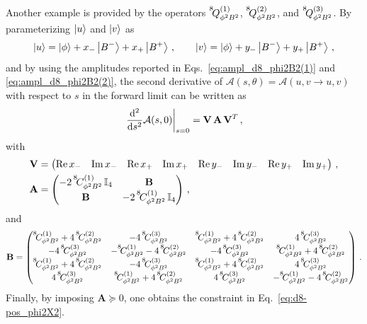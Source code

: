 Another example is provided by the operators $\op{8}{\phi^2 B^2}{(1)}$, $\op{8}{\phi^2 B^2}{(2)}$, and $\op{8}{\phi^2 B^2}{(3)}$.
By parameterizing $\ket{u}$ and $\ket{v}$ as
\begin{equation}
    \ket{u} = \ket{\phi}+x_-\ket{B^-}+x_+\ket{B^+}\,,
    \qquad 
    \ket{v} = \ket{\phi}+y_-\ket{B^-}+y_+\ket{B^+}\,,
\end{equation}
and by using the amplitudes reported in Eqs.~\eqref{eq:ampl_d8_phi2B2(1)} and \eqref{eq:ampl_d8_phi2B2(2)},
the second derivative of $\mathcal A(s,\theta) = \mathcal A(u,v \to u,v)$ with respect to $s$ in the forward limit can be written as
\begin{equation}
    \left.\dv[2]{}{s}\mathcal A(s,0)\right|_{s=0} = \mathbf V\,\mathbf A\,\mathbf V^{T}\,,
\end{equation}
with
\begin{align}
    \mathbf V &=
    \begin{pmatrix}
        \Re x_- & \Im x_- & \Re x_+ & \Im x_+ & \Re y_- & \Im y_- & \Re y_+ & \Im y_+
    \end{pmatrix}\,,
    \\
    \mathbf A &=
    \begin{pmatrix}
-2\,\coef{8}{\phi^2 B^2}{(1)}\,\mathbb{I}_{4} & \mathbf B \\
\mathbf B & -2\,\coef{8}{\phi^2 B^2}{(1)}\,\mathbb{I}_{4}
\end{pmatrix}\,,
\end{align}
and
\begin{equation}
    \mathbf B=
    \begin{pmatrix}
\coef{8}{\phi^2 B^2}{(1)} + 4\,\coef{8}{\phi^2 B^2}{(2)} & -4\,\coef{8}{\phi^2 B^2}{(3)} & \coef{8}{\phi^2 B^2}{(1)} + 4\,\coef{8}{\phi^2 B^2}{(2)} & 4\,\coef{8}{\phi^2 B^2}{(3)} \\
-4\,\coef{8}{\phi^2 B^2}{(3)} & -\coef{8}{\phi^2 B^2}{(1)} - 4\,\coef{8}{\phi^2 B^2}{(2)} & -4\,\coef{8}{\phi^2 B^2}{(3)} & \coef{8}{\phi^2 B^2}{(1)} + 4\,\coef{8}{\phi^2 B^2}{(2)} \\
\coef{8}{\phi^2 B^2}{(1)} + 4\,\coef{8}{\phi^2 B^2}{(2)} & -4\,\coef{8}{\phi^2 B^2}{(3)} & \coef{8}{\phi^2 B^2}{(1)} + 4\,\coef{8}{\phi^2 B^2}{(2)} & 4\,\coef{8}{\phi^2 B^2}{(3)} \\
4\,\coef{8}{\phi^2 B^2}{(3)} & \coef{8}{\phi^2 B^2}{(1)} + 4\,\coef{8}{\phi^2 B^2}{(2)} & 4\,\coef{8}{\phi^2 B^2}{(3)} & -\coef{8}{\phi^2 B^2}{(1)} - 4\,\coef{8}{\phi^2 B^2}{(2)}
\end{pmatrix}\,.
\end{equation}
Finally, by imposing $\mathbf A \succeq 0$, one obtains the constraint in Eq.~\eqref{eq:d8-pos_phi2X2}.


